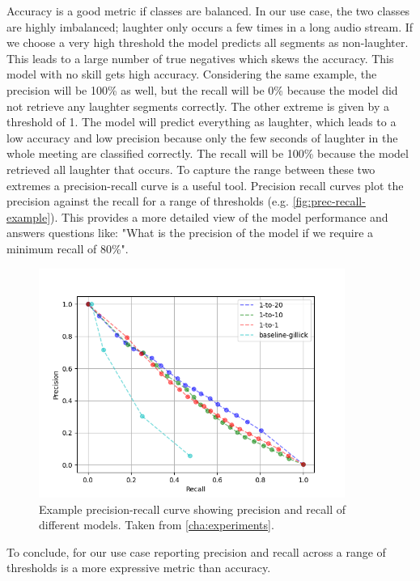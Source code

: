 \documentclass[bsc,frontabs,parskip,deptreport]{infthesis}
\begin{document}
Accuracy is a good metric if classes are balanced. In our use case, the two classes are highly imbalanced; laughter only occurs a few times in a long audio stream. If we choose a very high threshold the model predicts all segments as non-laughter. This leads to a large number of true negatives which skews the accuracy. This model with no skill gets high accuracy.
Considering the same example, the precision will be 100\% as well, but the recall will be 0\% because the model did not retrieve any laughter segments correctly. 
The other extreme is given by a threshold of 1. The model will predict everything as laughter, which leads to a low accuracy and low precision because only the few seconds of laughter in the whole meeting are classified correctly. The recall will be 100\% because the model retrieved all laughter that occurs. 
To capture the range between these two extremes a precision-recall curve is a useful tool. Precision recall curves plot the precision against the recall for a range of thresholds (e.g. \autoref{fig:prec-recall-example}). This provides a more detailed view of the model performance and answers questions like: "What is the precision of the model if we require a minimum recall of 80\%".

\begin{figure}[h!]
    \centering
    \includegraphics[width = 10cm]{imgs/prec-recall/exp1-random/dev_compare_class_balance_dev_set.png}
    \caption{Example precision-recall curve showing precision and recall of different models. Taken from \autoref{cha:experiments}.}
    \label{fig:prec-recall-example}
\end{figure}

To conclude, for our use case reporting precision and recall across a range of thresholds is a more expressive metric than accuracy.
\end{document}
